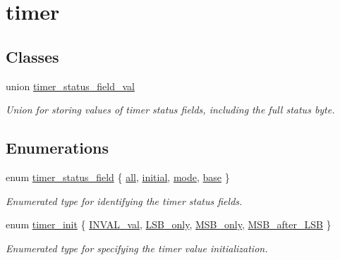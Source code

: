 \hypertarget{group__timer}{}\section{timer}
\label{group__timer}
\subsection*{Classes}
\begin{DoxyCompactItemize}
\item 
union \mbox{\hyperlink{uniontimer__status__field__val}{timer\+\_\+status\+\_\+field\+\_\+val}}
\begin{DoxyCompactList}\small\item\em Union for storing values of timer status fields, including the full status byte. \end{DoxyCompactList}\end{DoxyCompactItemize}
\subsection*{Enumerations}
\begin{DoxyCompactItemize}
\item 
enum \mbox{\hyperlink{group__timer_gada782f3116a896caaa602b70c0c6d8b7}{timer\+\_\+status\+\_\+field}} \{ \mbox{\hyperlink{group__timer_ggada782f3116a896caaa602b70c0c6d8b7a8701c301e7c87ec4d4f3aee33c6128d7}{all}}, 
\mbox{\hyperlink{group__timer_ggada782f3116a896caaa602b70c0c6d8b7a6c39f4aa1a0747304627e85d357f4bc8}{initial}}, 
\mbox{\hyperlink{group__timer_ggada782f3116a896caaa602b70c0c6d8b7af1982b2b77f9b0e7cd29e39b39d8a0b4}{mode}}, 
\mbox{\hyperlink{group__timer_ggada782f3116a896caaa602b70c0c6d8b7a27df5ef1a125f452469fe47a7158cb16}{base}}
 \}
\begin{DoxyCompactList}\small\item\em Enumerated type for identifying the timer status fields. \end{DoxyCompactList}\item 
enum \mbox{\hyperlink{group__timer_ga5cc20f14fd50625eea9b20f58fbe2a55}{timer\+\_\+init}} \{ \mbox{\hyperlink{group__timer_gga5cc20f14fd50625eea9b20f58fbe2a55a829d958875d8e92068f1b07f858721a4}{I\+N\+V\+A\+L\+\_\+val}}, 
\mbox{\hyperlink{group__timer_gga5cc20f14fd50625eea9b20f58fbe2a55a9a2e8b22f6d5ee33cc37829164a55955}{L\+S\+B\+\_\+only}}, 
\mbox{\hyperlink{group__timer_gga5cc20f14fd50625eea9b20f58fbe2a55ae46d93c3576b5f78ae1aeb4ee4fc4938}{M\+S\+B\+\_\+only}}, 
\mbox{\hyperlink{group__timer_gga5cc20f14fd50625eea9b20f58fbe2a55a7d392c02b4f52d93c10e4c646f8cedc7}{M\+S\+B\+\_\+after\+\_\+\+L\+SB}}
 \}
\begin{DoxyCompactList}\small\item\em Enumerated type for specifying the timer value initialization. \end{DoxyCompactList}\end{DoxyCompactItemize}
